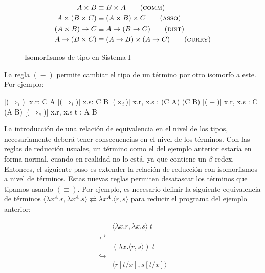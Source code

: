 \begin{figure}[H]
	\begin{align*}
		A \times B &\equiv B \times A \tag{\textsc{comm}} \\
		A \times (B \times C) &\equiv (A \times B) \times C \tag{\textsc{asso}} \\
		(A \times B) \rightarrow C &\equiv A \rightarrow (B \rightarrow C) \tag{\textsc{dist}} \\
		A \rightarrow (B \times C) &\equiv (A \rightarrow B) \times (A \rightarrow C) \tag{\textsc{curry}}
	\end{align*}
	
	\caption{Isomorfismos de tipo en Sistema I}
\end{figure}

La regla $(\equiv)$ permite cambiar el tipo de un término por otro isomorfo a este. Por ejemplo:

\begin{prooftree*}
	[($\Rightarrow_i$)]{ \Gamma\vdash \lambda x.r: C \rightarrow A }
	[($\Rightarrow_i$)]{ \Gamma\vdash \lambda x.s: C \rightarrow B }
	[($\times_i$)]{ \Gamma\vdash \langle \lambda x.r, \lambda x.s \rangle : (C \rightarrow A) \times (C \rightarrow B) }
	[($\equiv$)]{ \Gamma\vdash \langle \lambda x.r, \lambda x.s \rangle : C \rightarrow (A \times B) }
	[($\Rightarrow_e$)]{ \Gamma\vdash \langle \lambda x.r, \lambda x.s \rangle \; t : A \times B }
\end{prooftree*}

La introducción de una relación de equivalencia en el nivel de los tipos, necesariamente deberá tener consecuencias en el nivel de los términos.
Con las reglas de reducción usuales, un término como el del ejemplo anterior estaría en forma normal,  cuando en realidad no lo está, ya que contiene un $\beta$-redex.
Entonces, el siguiente paso es extender la relación de reducción con isomorfismos a nivel de términos.
Estas nuevas reglas permiten desatascar los términos que tipamos usando $(\equiv)$.
Por ejemplo, es necesario definir la siguiente equivalencia de términos $\langle \lambda x^A.r, \lambda x^A.s \rangle \rightleftarrows \lambda x^A. \langle r, s \rangle$ para reducir el programa del ejemplo anterior:

\begin{align*}
	& \langle \lambda x.r, \lambda x.s \rangle \; t \\
	\rightleftarrows& \\
	& (\lambda x. \langle r, s \rangle)\; t \\
	\hookrightarrow& \\
	& \langle r[t/x], s[t/x] \rangle
\end{align*}

